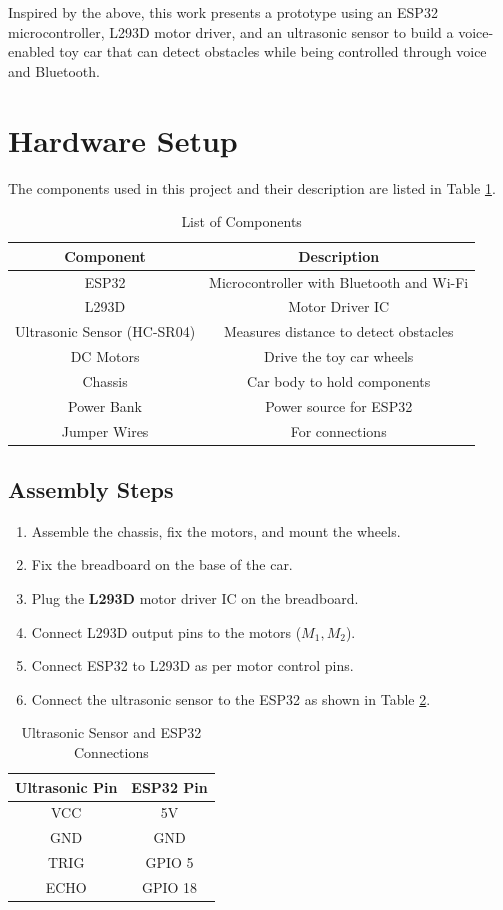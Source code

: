 \documentclass[a4paper,12pt]{article}
\begin{document}
Inspired by the above, this work presents a prototype using an ESP32 microcontroller, L293D motor driver, and an ultrasonic sensor to build a voice-enabled toy car that can detect obstacles while being controlled through voice and Bluetooth.

\section{Hardware Setup}
The components used in this project and their description are listed in Table \ref{table:list}.
\begin{table}[!h]
  \centering
  \begin{tabular}{|c|c|}
  \hline
  \textbf{Component} & \textbf{Description} \\
  \hline
  ESP32 & Microcontroller with Bluetooth and Wi-Fi \\
  L293D & Motor Driver IC \\
  Ultrasonic Sensor (HC-SR04) & Measures distance to detect obstacles \\
  DC Motors & Drive the toy car wheels \\
  Chassis & Car body to hold components \\
  Power Bank & Power source for ESP32 \\
  Jumper Wires & For connections \\
  \hline
  \end{tabular}
  \caption{List of Components}
  \label{table:list}
\end{table}

\subsection*{Assembly Steps}
\begin{enumerate}
\item Assemble the chassis, fix the motors, and mount the wheels.
\item Fix the breadboard on the base of the car.
\item Plug the \textbf{L293D} motor driver IC on the breadboard.
\item Connect L293D output pins to the motors ($M_1, M_2$).
\item Connect ESP32 to L293D as per motor control pins.
\item Connect the ultrasonic sensor to the ESP32 as shown in Table \ref{table:ultrasonic}.
\end{enumerate}

\begin{table}[!h]
  \centering
  \begin{tabular}{|c|c|}
  \hline
  \textbf{Ultrasonic Pin} & \textbf{ESP32 Pin} \\
  \hline
  VCC & 5V \\
  GND & GND \\
  TRIG & GPIO 5 \\
  ECHO & GPIO 18 \\
  \hline
  \end{tabular}
  \caption{Ultrasonic Sensor and ESP32 Connections}
  \label{table:ultrasonic}
\end{table}
\end{document}

